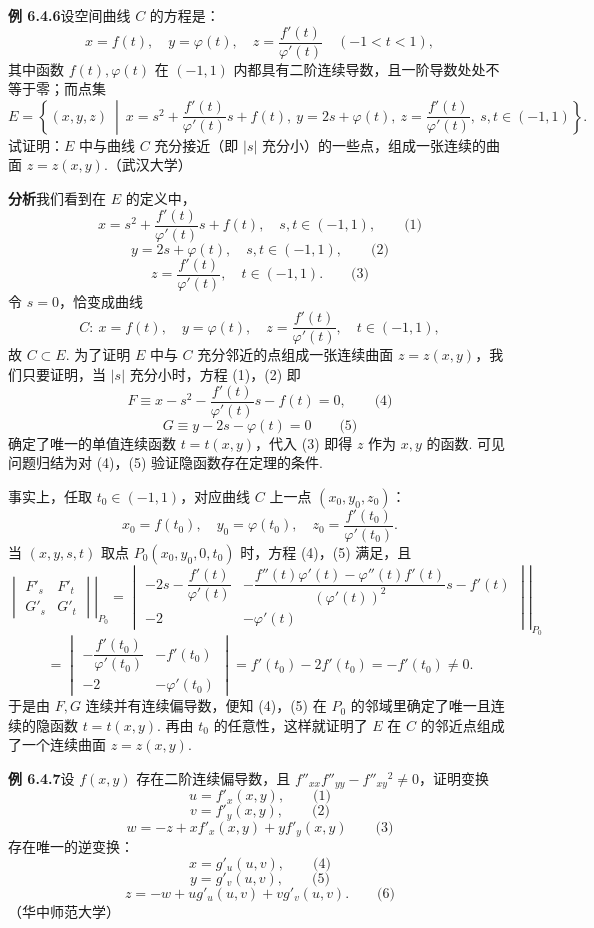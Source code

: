 \documentclass[UTF8, 12pt, fontset=fandol, oneside]{ctexart}
\begin{document}
\noindent\textbf{例 6.4.6}\quad 设空间曲线 $C$ 的方程是：
\[
  x=f(t),\quad y=\varphi(t),\quad
  z=\frac{f'(t)}{\varphi'(t)}\quad(-1<t<1),
\]
其中函数 $f(t),\varphi(t)$ 在 $(-1,1)$ 内都具有二阶连续导数，且一阶导数处处不等于零；而点集
\[
  E=\left\{(x,y,z)\ \middle|\ 
  x=s^2+\frac{f'(t)}{\varphi'(t)}s+f(t),\
  y=2s+\varphi(t),\
  z=\frac{f'(t)}{\varphi'(t)},\
  s,t\in(-1,1)\right\}.
\]
试证明：$E$ 中与曲线 $C$ 充分接近（即 $|s|$ 充分小）的一些点，组成一张连续的曲面 $z=z(x,y)$.（武汉大学）

\noindent\textbf{分析}\quad 我们看到在 $E$ 的定义中，
\[
  x=s^2+\frac{f'(t)}{\varphi'(t)}s+f(t),\quad s,t\in(-1,1), \qquad\text{(1)}
\]
\[
  y=2s+\varphi(t),\quad s,t\in(-1,1), \qquad\text{(2)}
\]
\[
  z=\frac{f'(t)}{\varphi'(t)},\quad t\in(-1,1). \qquad\text{(3)}
\]
令 $s=0$，恰变成曲线
\[
  C:\ x=f(t),\quad y=\varphi(t),\quad z=\frac{f'(t)}{\varphi'(t)},\quad t\in(-1,1),
\]
故 $C\subset E$. 为了证明 $E$ 中与 $C$ 充分邻近的点组成一张连续曲面 $z=z(x,y)$，我们只要证明，当 $|s|$ 充分小时，方程 (1)，(2) 即
\[
  F\equiv x-s^2-\frac{f'(t)}{\varphi'(t)}s-f(t)=0, \qquad\text{(4)}
\]
\[
  G\equiv y-2s-\varphi(t)=0 \qquad\text{(5)}
\]
确定了唯一的单值连续函数 $t=t(x,y)$，代入 (3) 即得 $z$ 作为 $x,y$ 的函数. 可见问题归结为对 (4)，(5) 验证隐函数存在定理的条件.

事实上，任取 $t_0\in(-1,1)$，对应曲线 $C$ 上一点 $(x_0,y_0,z_0)$：
\[
  x_0=f(t_0),\quad y_0=\varphi(t_0),\quad
  z_0=\frac{f'(t_0)}{\varphi'(t_0)}.
\]
当 $(x,y,s,t)$ 取点 $P_0(x_0,y_0,0,t_0)$ 时，方程 (4)，(5) 满足，且
\[
\left.\begin{vmatrix}
  F'_s & F'_t\\
  G'_s & G'_t
\end{vmatrix}\right|_{P_0}
=
\left.\begin{vmatrix}
  -2s-\dfrac{f'(t)}{\varphi'(t)} &
  -\dfrac{f''(t)\varphi'(t)-\varphi''(t)f'(t)}{(\varphi'(t))^2}s-f'(t)\\[6pt]
  -2 & -\varphi'(t)
\end{vmatrix}\right|_{P_0}
\]
\[
  =
\begin{vmatrix}
  -\dfrac{f'(t_0)}{\varphi'(t_0)} & -f'(t_0)\\[6pt]
  -2 & -\varphi'(t_0)
\end{vmatrix}
=f'(t_0)-2f'(t_0)=-f'(t_0)\ne0.
\]
于是由 $F,G$ 连续并有连续偏导数，便知 (4)，(5) 在 $P_0$ 的邻域里确定了唯一且连续的隐函数 $t=t(x,y)$. 再由 $t_0$ 的任意性，这样就证明了 $E$ 在 $C$ 的邻近点组成了一个连续曲面 $z=z(x,y)$.

\noindent\textbf{例 6.4.7}\quad 设 $f(x,y)$ 存在二阶连续偏导数，且
$f''_{xx}f''_{yy}-f''_{xy}{}^2\ne0$，证明变换
\[
  u=f'_x(x,y), \qquad\text{(1)}
\]
\[
  v=f'_y(x,y), \qquad\text{(2)}
\]
\[
  w=-z+xf'_x(x,y)+yf'_y(x,y) \qquad\text{(3)}
\]
存在唯一的逆变换：
\[
  x=g'_u(u,v), \qquad\text{(4)}
\]
\[
  y=g'_v(u,v), \qquad\text{(5)}
\]
\[
  z=-w+ug'_u(u,v)+vg'_v(u,v). \qquad\text{(6)}
\]
（华中师范大学）
\end{document}
